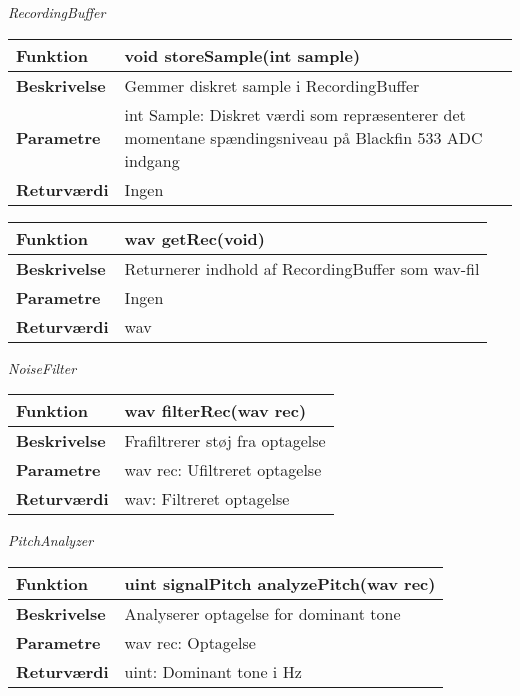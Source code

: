 \textit{RecordingBuffer} \\

\begin{center}
    \begin{tabular}{ | l | p{10cm} |}
    \hline
    \textbf{Funktion}	 	& void storeSample(int sample)								\\ \hline
    \textbf{Beskrivelse} 	& Gemmer diskret sample i RecordingBuffer					\\ \hline
    \textbf{Parametre}		& int Sample: Diskret værdi som repræsenterer det momentane spændingsniveau på Blackfin 533 ADC indgang														 		\\ \hline
    \textbf{Returværdi} 	& Ingen		 												\\ \hline
    \end{tabular}
\end{center}

\begin{center}
    \begin{tabular}{ | l | p{10cm} |}
    \hline
    \textbf{Funktion}	 	& wav getRec(void)										\\ \hline
    \textbf{Beskrivelse} 	& Returnerer indhold af RecordingBuffer som wav-fil		\\ \hline
    \textbf{Parametre}		& Ingen			 										\\ \hline
    \textbf{Returværdi} 	& wav		 											\\ \hline
    \end{tabular}
\end{center}

\textit{NoiseFilter} \\
\begin{center}
    \begin{tabular}{ | l | p{10cm} |}
    \hline
    \textbf{Funktion}	 	& wav filterRec(wav rec)								\\ \hline
    \textbf{Beskrivelse} 	& Frafiltrerer støj fra optagelse						\\ \hline
    \textbf{Parametre}		& wav rec: Ufiltreret optagelse		 					\\ \hline
    \textbf{Returværdi} 	& wav: Filtreret optagelse							\\ \hline
    \end{tabular}
\end{center}

\textit{PitchAnalyzer} \\
\begin{center}
    \begin{tabular}{ | l | p{10cm} |}
    \hline
    \textbf{Funktion}	 	& uint signalPitch analyzePitch(wav rec)						\\ \hline
    \textbf{Beskrivelse} 	& Analyserer optagelse for dominant tone					    \\ \hline
    \textbf{Parametre}		& wav rec: Optagelse						 					\\ \hline
    \textbf{Returværdi} 	& uint: Dominant tone i Hz										\\ \hline
    \end{tabular}
\end{center}

